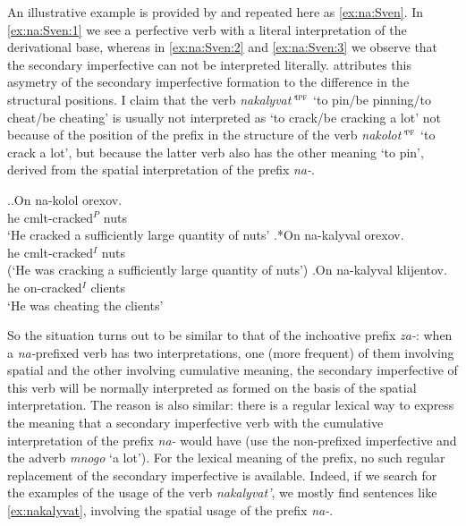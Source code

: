 An illustrative example is provided by \citet[233]{Svenonius:04b} and repeated here as \ref{ex:na:Sven}. In \ref{ex:na:Sven:1} we see a perfective verb with a literal interpretation of the derivational base, whereas in \ref{ex:na:Sven:2} and \ref{ex:na:Sven:3} we observe that the secondary imperfective can not be interpreted literally. \citet[233]{Svenonius:04b} attributes this asymetry of the secondary imperfective formation to the difference in the structural positions. I claim that the verb \textit{nakalyvat'}$^{\textsc{ipf}}$ `to pin/be pinning/to cheat/be cheating' is usually not interpreted as `to crack/be cracking a lot' not because of the position of the prefix in the structure of the verb \textit{nakolot'}$^{\textsc{pf}}$ `to crack a lot', but because the latter verb also has the other meaning `to pin', derived from the spatial interpretation of the prefix \textit{na-}. 

\ex.\label{ex:na:Sven}\ag.\label{ex:na:Sven:1}On na-kolol orexov.\\
he cmlt-cracked$^P$ nuts\\
\trans `He cracked a sufficiently large quantity of nuts'
\bg.\label{ex:na:Sven:2}*On na-kalyval orexov.\\
he cmlt-cracked$^I$ nuts\\
\vspace{0.5em}
(`He was cracking a sufficiently large quantity of nuts')
\bg.\label{ex:na:Sven:3}On na-kalyval klijentov.\\
he on-cracked$^I$ clients\\
\trans `He was cheating the clients'\\

So the situation turns out to be similar to that of the inchoative prefix \textit{za-}: when a \textit{na-}prefixed verb has two interpretations, one (more frequent) of them involving spatial and the other involving cumulative meaning, the secondary imperfective of this verb will be normally interpreted as formed on the basis of the spatial interpretation. The reason is also similar: there is a regular lexical way to express the meaning that a secondary imperfective verb with the cumulative interpretation of the prefix \textit{na-} would have (use the non-prefixed imperfective and the adverb \textit{mnogo} `a lot'). For the lexical meaning of the prefix, no such regular replacement of the secondary imperfective is available. Indeed, if we search for the examples of the usage of the verb \textit{nakalyvat'}, we mostly find sentences like \ref{ex:nakalyvat}, involving the spatial usage of the prefix \textit{na-}. 

